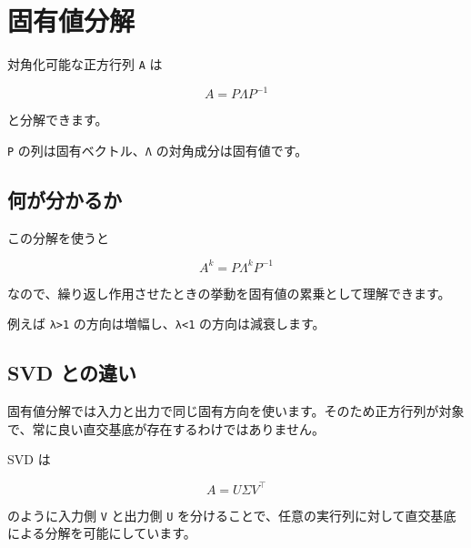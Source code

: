 \documentclass[
  11pt,
  a4paper,
]{ltjsarticle}
\author{}
\date{}
\begin{document}
\hypertarget{ux56faux6709ux5024ux5206ux89e3}{%
\section{固有値分解}\label{ux56faux6709ux5024ux5206ux89e3}}

対角化可能な正方行列 \texttt{A} は

\[
A=P\Lambda P^{-1}
\]

と分解できます。

\texttt{P} の列は固有ベクトル、\texttt{Λ} の対角成分は固有値です。

\hypertarget{ux4f55ux304cux5206ux304bux308bux304b}{%
\subsection{何が分かるか}\label{ux4f55ux304cux5206ux304bux308bux304b}}

この分解を使うと

\[
A^k=P\Lambda^kP^{-1}
\]

なので、繰り返し作用させたときの挙動を固有値の累乗として理解できます。

例えば \texttt{\textbar{}λ\textbar{}\textgreater{}1}
の方向は増幅し、\texttt{\textbar{}λ\textbar{}\textless{}1}
の方向は減衰します。

\hypertarget{svd-ux3068ux306eux9055ux3044}{%
\subsection{SVD との違い}\label{svd-ux3068ux306eux9055ux3044}}

固有値分解では入力と出力で同じ固有方向を使います。そのため正方行列が対象で、常に良い直交基底が存在するわけではありません。

SVD は

\[
A=U\Sigma V^\top
\]

のように入力側 \texttt{V} と出力側 \texttt{U}
を分けることで、任意の実行列に対して直交基底による分解を可能にしています。
\end{document}
